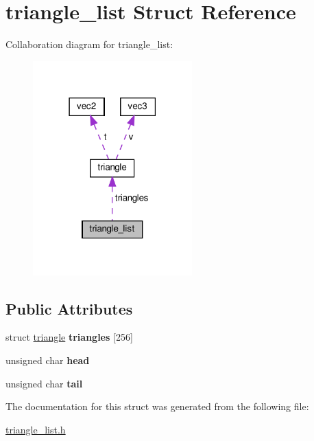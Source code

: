 \hypertarget{structtriangle__list}{}\section{triangle\+\_\+list Struct Reference}
\label{structtriangle__list}


Collaboration diagram for triangle\+\_\+list\+:\nopagebreak
\begin{figure}[H]
\begin{center}
\leavevmode
\includegraphics[width=174pt]{structtriangle__list__coll__graph}
\end{center}
\end{figure}
\subsection*{Public Attributes}
\begin{DoxyCompactItemize}
\item 
\mbox{\label{structtriangle__list_a58b750d732071bd30a0befc681b69465}} 
struct \hyperlink{structtriangle}{triangle} {\bfseries triangles} \mbox{[}256\mbox{]}
\item 
\mbox{\label{structtriangle__list_a207f63c76994dd2289372305653f6b69}} 
unsigned char {\bfseries head}
\item 
\mbox{\label{structtriangle__list_aa5162192749bbef4c2776e236619b00b}} 
unsigned char {\bfseries tail}
\end{DoxyCompactItemize}


The documentation for this struct was generated from the following file\+:\begin{DoxyCompactItemize}
\item 
\hyperlink{triangle__list_8h}{triangle\+\_\+list.\+h}\end{DoxyCompactItemize}
